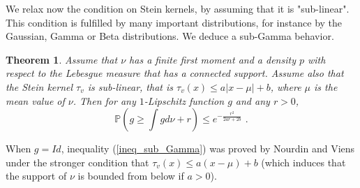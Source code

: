 \documentclass[11pt]{article}
\newtheorem{theorem}{Theorem}
\begin{document}
We relax now the condition on Stein kernels, by assuming that it is
"sub-linear". This condition is fulfilled by many important distributions,
for instance by the Gaussian, Gamma or Beta distributions. We deduce a
sub-Gamma behavior.

\begin{theorem}
\label{theorem_concentration_gamma}Assume that $\nu $ has a finite first
moment and a density $p$ with respect to the Lebesgue measure that has a
connected support. Assume also that the Stein kernel $\tau _{v}$ is
sub-linear, that is $\tau _{v}(x)\leq a\left\vert x-\mu \right\vert +b$,
where $\mu $ is the mean value of $\nu $. Then for any $1$-Lipschitz
function $g$ and any $r>0$,%
\begin{equation}
\mathbb{P}\left( g\geq \int gd\nu +r\right) \leq e^{-\frac{r^{2}}{2ar+2b}}%
\text{ .}  \label{ineq_sub_Gamma}
\end{equation}
\end{theorem}

When $g=Id$, inequality (\ref{ineq_sub_Gamma}) was proved by Nourdin and
Viens \cite{MR2556018} under the stronger condition that $\tau _{v}(x)\leq
a\left( x-\mu \right) +b$ (which induces that the support of $\nu $ is
bounded from below if $a>0$).
\end{document}
